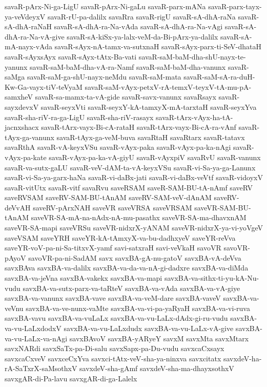{savaR-pArx-Ni-ga-LigU
savaR-pArx-Ni-gaLu
savaR-parx-mANa
savaR-parx-tayx-ya-veVdeyxV
savaR-rU-pa-dalilx
savaRra
savaR-rigU
savaR-sA-dhA-raNa
savaR-sA-dhA-raNaH
savaR-sA-dhA-ra-Na-vAda
savaR-sA-dhA-ra-Na-vAgi
savaR-sA-dhA-ra-Na-vA-give
savaR-sA-kiSx-ya-lalx-veM-da-Bi-pArx-ya-dalilx
savaR-sA-mA-nayx-vAda
savaR-sAyx-nA-tamx-va-sutxnaH
savaR-sAyx-parx-ti-SeV-dhataH
savaR-sAyxsAyx
savaR-sAyx-tAtx-Ba-vati
savaR-saM-baM-dha-shU-nayx-te-yanunx
savaR-saM-baM-dha-vA-ra-Namf
savaR-saM-baM-dha-vanunx
savaR-saMga
savaR-saM-ga-shU-nayx-neMdu
savaR-saM-mata
savaR-saM-sA-ra-duH-Kw-Ga-vayx-tiV-teVyaM
savaR-saM-vAyx-petxV-rA-temxV-teyxV-tA-mu-pA-samxheV
savaR-sa-mamx-ta-vA-gide
savaR-savx-vanunx
savaRsayx
savaR-sayxdevxV
savaR-seyxVti
savaR-seyxY-kA-tamxyX-mA-tarxtaH
savaR-seyxYva
savaR-sha-riV-ra-ga-LigU
savaR-sha-riV-rasayx
savaR-tArx-vAyx-ha-tA-jacnxshacx
savaR-tArx-vayx-Bi-cA-rataH
savaR-tArx-vayx-Bi-cA-ra-vAnf
savaR-tAyx-ga-vanunx
savaR-tAyx-ga-veM-buva
savaRtaH
savaRtarx
savaR-tatavx
savaRthA
savaR-vA-keyxVSu
savaR-vAyx-paka
savaR-vAyx-pa-ka-nAgi
savaR-vAyx-pa-kate
savaR-vAyx-pa-ka-vA-giyU
savaR-vAyxpiV
savaRvU
savaR-vanunx
savaR-va-sutx-gaLU
savaR-veV-dAM-ta-vA-keyxVSu
savaR-vi-Sa-ya-ga-Lanunx
savaR-vi-Sa-ya-garx-haNa
savaR-vi-daBx-jati
savaR-vi-daBx-veVtf
savaR-vidoyxV
savaR-vitUtx
savaR-vitf
savaRvu
saveRSAM
saveR-SAM-BU-tA-nAmf
saveRV
saveRVSAM
saveRV-SAM-BU-tAnAM
saveRV-SAM-veV-dAnAM
saveRV-deVvAH
saveRV-pArxNAH
saveVR
saveVRSA
saveVRSAM
saveVR-SAM-BU-tAnAM
saveVR-SA-mA-na-nAdx-nA-mu-pasathx
saveVR-SA-ma-dhavxnAM
saveVR-SA-mapi
saveVRSu
saveVR-nidxrX-yANAM
saveVR-nidxrX-ya-vi-yoVgeV
saveVSAM
saveYRH
saveYR-kA-tAmxyX-va-bu-dadhxyeV
saveYR-reVva
saveYR-voV-pa-ni-Sa-titxvX-yamf
savi-satxraH
savi-veVkaH
savoVR
savoVR-pAyoV
savoVR-pa-ni-SadAM
savx
savxBA-gA-nu-gatoV
savxBA-vA-deVva
savxBAva
savxBA-va-dalilx
savxBA-va-da-va-nA-gi-dadxre
savxBA-va-diMda
savxBA-va-jeVna
savxBA-vakekx
savxBA-va-mapi
savxBA-va-sithx-ti-yu-kA-Nu-vudu
savxBA-va-sutx-parx-va-taRteV
savxBA-va-vAda
savxBA-va-vA-giye
savxBA-va-vanunx
savxBA-vave
savxBA-va-veM-dare
savxBA-vaveV
savxBA-va-veVnu
savxBA-va-ve-nunx-vaMte
savxBA-va-vi-pa-yaRyaH
savxBA-va-vi-ruva
savxBA-vavu
savxBA-va-vuLaLx
savxBA-va-vu-LaLx-dAdx-gi-ru-vudu
savxBA-va-vu-LaLxdodxV
savxBA-va-vu-LaLxdudx
savxBA-va-vu-LaLx-vA-give
savxBA-va-vu-LaLx-va-nAgi
savxBAvoV
savxBA-yARyeY
savxM
savxMta
savxMtarx
savxNARdi
savxSaTx-pa-Di-salu
savxSapx-pa-Du-vudu
savxcaCxsayx
savxcaCxveV
savxceCxYva
savxci-tAtx-veV-sha-ya-ninxva
savxcitatx
savxdeV-ha-rA-SaTxrX-saMsothxV
savxdeV-sha-gAmf
savxdeV-sha-ma-dhayxsothxV
savxgAR-di-Pa-lavu
savxgAR-di-ga-Lalelx
}

